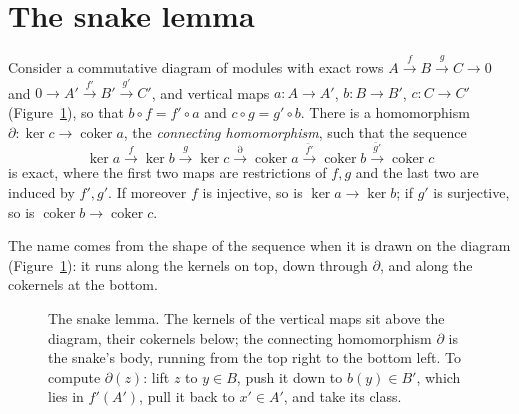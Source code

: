 \section{The snake lemma}

\begin{theorem}\label{thm:snake}
Consider a commutative diagram of modules with exact rows $A\xrightarrow fB\xrightarrow gC\to0$ and $0\to A'\xrightarrow{f'}B'\xrightarrow{g'}C'$, and vertical maps
$a\colon A\to A'$, $b\colon B\to B'$, $c\colon C\to C'$ (Figure~\ref{fig:snake}), so that $b\circ f=f'\circ a$ and $c\circ g=g'\circ b$. There is a homomorphism $\partial\colon\ker c\to\operatorname{coker}a$, the \emph{connecting homomorphism}, such that the sequence
\[\ker a\xrightarrow{f}\ker b\xrightarrow{g}\ker c\xrightarrow{\partial}\operatorname{coker}a\xrightarrow{\bar f'}\operatorname{coker}b\xrightarrow{\bar g'}\operatorname{coker}c\]
is exact, where the first two maps are restrictions of $f,g$ and the last two are induced by $f',g'$. If moreover $f$ is injective, so is $\ker a\to\ker b$; if $g'$ is surjective, so is $\operatorname{coker}b\to\operatorname{coker}c$.
\end{theorem}

The name comes from the shape of the sequence when it is drawn on the diagram (Figure~\ref{fig:snake}): it runs along the kernels on top, down through $\partial$, and along the cokernels at the bottom.

\begin{figure}[ht]
\centering
{}
\caption{The snake lemma. The kernels of the vertical maps sit above the diagram, their cokernels below; the connecting homomorphism $\partial$ is the snake's body, running from the
top right to the bottom left. To compute $\partial(z)$: lift $z$ to $y\in B$, push it down to $b(y)\in B'$, which lies in $f'(A')$, pull it back to $x'\in A'$, and take its class.}
\label{fig:snake}
\end{figure}

